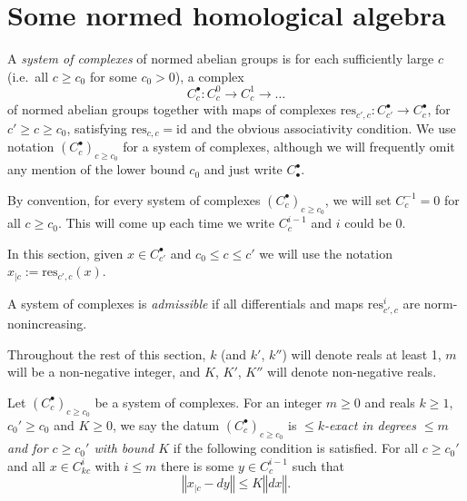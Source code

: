 \section{Some normed homological algebra}%
\label{sec:some_normed_homological_algebra}

\begin{definition}
  \label{system_of_complexes}
  \leanok
  A \emph{system of complexes} of normed abelian groups
  is for each sufficiently large $c$ (i.e.~all $c\geq c_0$ for some $c_0>0$),
  a complex
  \[
  C_c^\bullet: C_c^0\to C_c^1\to\ldots
  \]
  of normed abelian groups together with maps of complexes
  $\mathrm{res}_{c',c}: C_{c'}^\bullet\to C_c^\bullet$,
  for $c' ≥ c \geq c_0$,
  satisfying $\mathrm{res}_{c,c}=\mathrm{id}$ and the obvious associativity condition.
  We use notation $(C_c^\bullet)_{c\geq c_0}$ for a system of complexes,
  although we will frequently omit any mention of the lower bound $c_0$
  and just write $C_\bullet^\bullet$.
\end{definition}

By convention, for every system of complexes $(C_c^\bullet)_{c\geq c_0}$,
we will set $C^{-1}_c = 0$ for all $c\geq c_0$.
This will come up each time we write $C^{i-1}_c$ and $i$ could be $0$.

In this section, given $x ∈ C^•_{c'}$ and $c_0\leq c ≤ c'$ we will use the notation
$x_{|c} := \mathrm{res}_{c', c}(x)$.

\begin{definition}
  \label{admissible}
  \leanok
  A system of complexes is \emph{admissible}
  if all differentials and maps $\mathrm{res}_{c',c}^i$ are norm-nonincreasing.
\end{definition}

Throughout the rest of this section, $k$ (and $k'$, $k''$) will denote reals at least 1,
$m$ will be a non-negative integer, and $K$, $K'$, $K''$ will denote non-negative reals.

\begin{definition}
  \label{is_bounded_exact}
  \leanok
  Let $(C_c^\bullet)_{c\geq c_0}$ be a system of complexes.
  For an integer $m\geq 0$ and reals $k \ge 1$, $c_0'\geq c_0$ and $K\geq0$,
  we say the datum $(C_c^\bullet)_{c\geq c_0}$ is
  \emph{$\leq k$-exact in degrees $\leq m$ and for $c\geq c_0'$ with bound $K$} if the following condition is satisfied.
  For all $c\geq c_0'$ and all $x\in C_{kc}^i$ with $i\leq m$
  there is some $y\in C_c^{i-1}$ such that
  \[
    ‖x_{|c} - dy‖ ≤ K ‖dx‖.
  \]
\end{definition}

